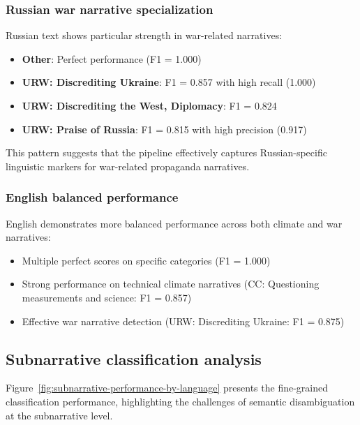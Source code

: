 \subsubsection{Russian war narrative specialization}

Russian text shows particular strength in war-related narratives:
\begin{itemize}
    \item \textbf{Other}: Perfect performance (F1 = 1.000)
    \item \textbf{URW: Discrediting Ukraine}: F1 = 0.857 with high recall (1.000)
    \item \textbf{URW: Discrediting the West, Diplomacy}: F1 = 0.824
    \item \textbf{URW: Praise of Russia}: F1 = 0.815 with high precision (0.917)
\end{itemize}

This pattern suggests that the pipeline effectively captures Russian-specific linguistic markers for war-related propaganda narratives.

\subsubsection{English balanced performance}

English demonstrates more balanced performance across both climate and war narratives:
\begin{itemize}
    \item Multiple perfect scores on specific categories (F1 = 1.000)
    \item Strong performance on technical climate narratives (CC: Questioning measurements and science: F1 = 0.857)
    \item Effective war narrative detection (URW: Discrediting Ukraine: F1 = 0.875)
\end{itemize}

\subsection{Subnarrative classification analysis}

Figure~\ref{fig:subnarrative-performance-by-language} presents the fine-grained classification performance, highlighting the challenges of semantic disambiguation at the subnarrative level.

